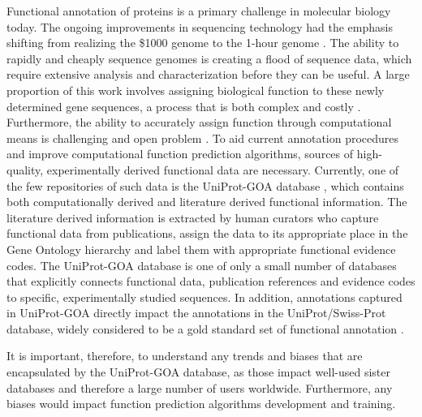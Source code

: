 \documentclass[12pt]{article}
\begin{document}
Functional annotation of proteins is a primary challenge in molecular biology
today\cite{Friedberg2006Automated,Erdin2011180,Rentzsch2009210,Fetrow2012}. The ongoing
improvements
in sequencing technology had the emphasis shifting from realizing the \$1000
genome to the 1-hour genome \cite{PMID Stahl2012Toward}. The ability to rapidly and
cheaply sequence genomes is creating a flood of sequence data, which require extensive
analysis and characterization before they can be useful. A large proportion of this work
involves assigning biological function to these newly determined gene sequences, a process
that is both complex and costly \cite{Sboner2011Real}. Furthermore,  the ability to
accurately assign function through computational means is challenging and open problem
\cite{Schnoes2009Annotation}. To aid current annotation procedures and improve computational
function prediction algorithms, sources of high-quality, experimentally derived functional
data are necessary.  Currently, one of the few repositories of such data is the UniProt-GOA
database \cite{Dimmer2012UniProtGO}, which contains both computationally derived and
literature derived functional information. The literature derived information is extracted
by human curators who capture functional data from publications, assign the data to its
appropriate place in the Gene Ontology hierarchy \cite{Ashburner2000Gene} and label them
with appropriate functional evidence codes. The UniProt-GOA database is one of only a small
number of databases that explicitly connects functional data, publication references and
evidence codes to specific, experimentally studied sequences.  In addition, annotations
captured in UniProt-GOA directly impact the annotations in the UniProt/Swiss-Prot database,
widely considered to be a gold standard set of functional annotation
\cite{Schnoes2009Annotation}. 

It is important, therefore, to understand any trends and biases that are
encapsulated by the UniProt-GOA database, as those impact well-used sister
databases and therefore a large number of users worldwide. Furthermore,
any biases would impact function prediction algorithms development and training.
\end{document}
